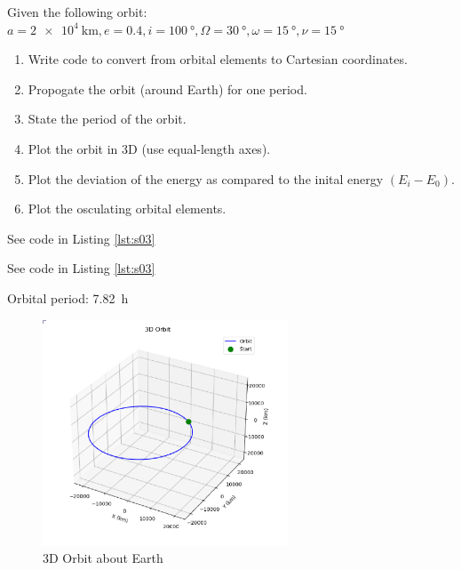 \begin{hwkProblem}{3}{}

	Given the following orbit: \( a=\qty{2e4}{\km}, e=0.4, i=\qty{100}{\degree}, \Omega=\qty{30}{\degree}, \omega=\qty{15}{\degree}, \nu=\qty{15}{\degree} \)
	\begin{enumerate}
		\item Write code to convert from orbital elements to Cartesian coordinates.
		\item Propogate the orbit (around Earth) for one period.
		\item State the period of the orbit.
		\item Plot the orbit in 3D (use equal-length axes).
		\item Plot the deviation of the energy as compared to the inital energy \( \left( E_i - E_0 \right) \).
		\item Plot the osculating orbital elements.
	\end{enumerate}

	\hwkSol

	\hwkPart

	See code in Listing \ref{lst:s03}

	\hwkPart

	See code in Listing \ref{lst:s03}

	\hwkPart

	Orbital period: \qty{7.82}{\hour}

	\hwkPart

	\begin{figure}[H]
		\begin{center}
			\includegraphics[width=0.65\textwidth]{./images/s03d.png}
		\end{center}
		\caption{3D Orbit about Earth}\label{fig:s03d}
	\end{figure}


\end{hwkProblem}
